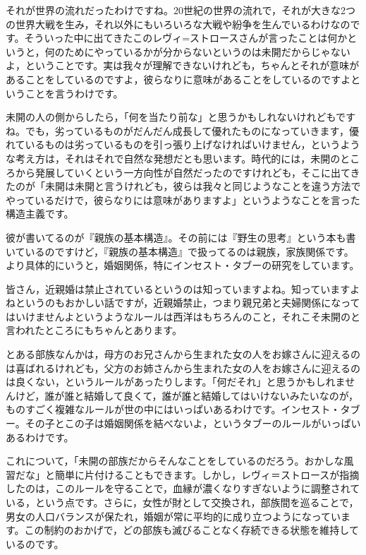 \documentclass{ltjsbook}
\begin{document}
それが世界の流れだったわけですね。20世紀の世界の流れで，それが大きな2つの世界大戦を生み，それ以外にもいろいろな大戦や紛争を生んでいるわけなのです。そういった中に出てきたこのレヴィ=ストロースさんが言ったことは何かというと，何のためにやっているかが分からないというのは未開だからじゃないよ，ということです。実は我々が理解できないけれども，ちゃんとそれが意味があることをしているのですよ，彼らなりに意味があることをしているのですよということを言うわけです。

未開の人の側からしたら，「何を当たり前な」と思うかもしれないけれどもですね。でも，劣っているものがだんだん成長して優れたものになっていきます，優れているものは劣っているものを引っ張り上げなければいけません，というような考え方は，それはそれで自然な発想だとも思います。時代的には，未開のところから発展していくという一方向性が自然だったのですけれども，そこに出てきたのが「未開は未開と言うけれども，彼らは我々と同じようなことを違う方法でやっているだけで，彼らなりには意味がありますよ」というようなことを言った構造主義です。

彼が書いてるのが『親族の基本構造』。その前には『野生の思考』という本も書いているのですけど，『親族の基本構造』で扱ってるのは親族，家族関係です。より具体的にいうと，婚姻関係，特にインセスト・タブーの研究をしています。

皆さん，近親婚は禁止されているというのは知っていますよね。知っていますよねというのもおかしい話ですが，近親婚禁止，つまり親兄弟と夫婦関係になってはいけませんよというようなルールは西洋はもちろんのこと，それこそ未開のと言われたところにもちゃんとあります。

とある部族なんかは，母方のお兄さんから生まれた女の人をお嫁さんに迎えるのは喜ばれるけれども，父方のお姉さんから生まれた女の人をお嫁さんに迎えるのは良くない，というルールがあったりします。「何だそれ」と思うかもしれませんけど，誰が誰と結婚して良くて，誰が誰と結婚してはいけないみたいなのが，ものすごく複雑なルールが世の中にはいっぱいあるわけです。インセスト・タブー。その子とこの子は婚姻関係を結べないよ，というタブーのルールがいっぱいあるわけです。

これについて，「未開の部族だからそんなことをしているのだろう。おかしな風習だな」と簡単に片付けることもできます。しかし，レヴィ＝ストロースが指摘したのは，このルールを守ることで，血縁が濃くなりすぎないように調整されている，という点です。さらに，女性が財として交換され，部族間を巡ることで，男女の人口バランスが保たれ，婚姻が常に平均的に成り立つようになっています。この制約のおかげで，どの部族も滅びることなく存続できる状態を維持しているのです。
\end{document}

